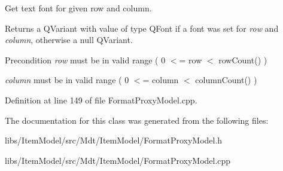 Get text font for given row and column. 

Returns a Q\+Variant with value of type Q\+Font if a font was set for {\itshape row} and {\itshape column}, otherwise a null Q\+Variant.

\begin{DoxyPrecond}{Precondition}
{\itshape row} must be in valid range ( 0 $<$= row $<$ row\+Count() ) 

{\itshape column} must be in valid range ( 0 $<$= column $<$ column\+Count() ) 
\end{DoxyPrecond}


Definition at line 149 of file Format\+Proxy\+Model.\+cpp.



The documentation for this class was generated from the following files\+:\begin{DoxyCompactItemize}
\item 
libs/\+Item\+Model/src/\+Mdt/\+Item\+Model/Format\+Proxy\+Model.\+h\item 
libs/\+Item\+Model/src/\+Mdt/\+Item\+Model/Format\+Proxy\+Model.\+cpp\end{DoxyCompactItemize}
